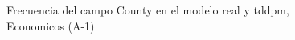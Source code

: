 \begin{figure}[H]
    \centering
    
    \caption{Frecuencia del campo County en el modelo real y tddpm, Economicos (A-1)}
    \label{frecuency-County-tddpm_mlp}
\end{figure}